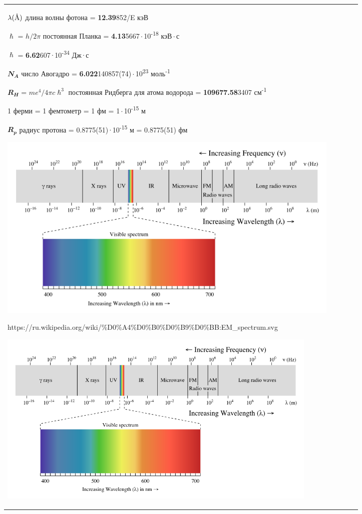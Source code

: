 \documentclass[a4paper,14pt, openany, twoside, draft]{extbook} %
\newcommand{\AAA}{\textup{\AA}}
\begin{document}
\begin{flushleft}
\begin{supertabular}{|m{1.7279999cm}|m{1.522cm}|m{1.522cm}|m{1.522cm}|m{1.744cm}|}
$\lambda(\AAA)$  длина волны фотона = \textbf{12.39}852/E кэВ

$\mathbfit{\hslash}$ = $h/2\pi$ постоянная Планка = \textbf{4.13}5667\,$\cdot$\,10\textsuperscript{-18} кэВ\,$\cdot$\,с

$\mathbfit{\hslash}$ = \textbf{6.62}607\,$\cdot$\,10\textsuperscript{-34} Дж\,$\cdot$\,с

$\mathbfit{N_A}$  число Авогадро = \textbf{6.022}140857(74)\,$\cdot$\,10\textsuperscript{23} моль\textsuperscript{-1}

$\mathbfit{R_H}$ = $me^4/4\pi c\hslash^3$ постоянная Ридберга для атома водорода = \textbf{109677.58}3407 см\textsuperscript{-1}

1 ферми = 1 фемтометр = 1 фм = 1\,$\cdot$\,10\textsuperscript{-15} м

$\mathbfit{R_p}$ радиус протона = 0.8775(51)\,$\cdot$\,10\textsuperscript{-15} м = 0.8775(51) фм

\clearpage{}
 \includegraphics[width=16.866cm,height=9.022cm]{EMRad-img001.png}

https://ru.wikipedia.org/wiki/\%D0\%A4\%D0\%B0\%D0\%B9\%D0\%BB:EM\_spectrum.svg

 \includegraphics[width=15.665cm,height=8.382cm]{EMRad-img002.png}


\end{supertabular}
\end{flushleft}
\end{document}
